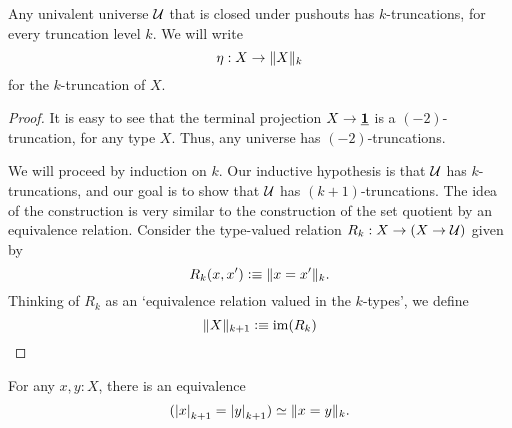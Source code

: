 \begin{thm}
  Any univalent universe $\UU$ that is closed under pushouts has $k$-truncations, for every truncation level $k$. We will write
  \begin{equation*}
    \eta:X\to\trunc{k}{X}
  \end{equation*}
  for the $k$-truncation of $X$.
\end{thm}

\begin{proof}
  It is easy to see that the terminal projection $X\to\unit$ is a $(-2)$-truncation, for any type $X$. Thus, any universe has $(-2)$-truncations.

  We will proceed by induction on $k$. Our inductive hypothesis is that $\UU$ has $k$-truncations, and our goal is to show that $\UU$ has $(k+1)$-truncations. The idea of the construction is very similar to the construction of the set quotient by an equivalence relation. Consider the type-valued relation $R_k:X\to (X\to \UU)$ given by
  \begin{equation*}
    R_k(x,x') \defeq \trunc{k}{x=x'}.
  \end{equation*}
  Thinking of $R_k$ as an `equivalence relation valued in the $k$-types', we define
  \begin{equation*}
    \trunc{k+1}{X}\defeq \im(R_k)
  \end{equation*}
\end{proof}

\begin{cor}\label{thm:trunc_id}
For any $x,y:X$, there is an equivalence
\begin{equation*}
\eqv{(\tproj{k+1}{x}=\tproj{k+1}{y})}{\trunc{k}{x=y}}.
\end{equation*}
\end{cor}

